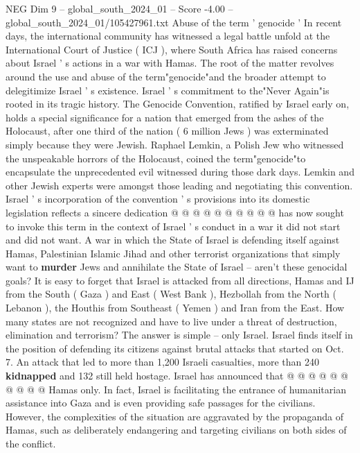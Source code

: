 \begin{textsample}{NEG Dim 9 – global\_south\_2024\_01 – Score -4.00 – global\_south\_2024\_01/105427961.txt}  \label{ex:f9_neg_427}
Abuse of the term ' genocide ' In recent days, the international community has witnessed a legal battle unfold at the International Court of Justice ( ICJ ), where South Africa has raised concerns about Israel ' s actions in a war with Hamas.
The root of the matter revolves around the use and abuse of the term"genocide"and the broader attempt to delegitimize Israel ' s existence.
Israel ' s commitment to the"Never Again"is rooted in its tragic history.
The Genocide Convention, ratified by Israel early on, holds a special significance for a nation that emerged from the ashes of the Holocaust, after one third of the nation ( 6 million Jews ) was exterminated simply because they were Jewish.
Raphael Lemkin, a Polish Jew who witnessed the unspeakable horrors of the Holocaust, coined the term"genocide"to encapsulate the unprecedented evil witnessed during those dark days.
Lemkin and other Jewish experts were amongst those leading and negotiating this convention.
Israel ' s incorporation of the convention ' s provisions into its domestic legislation reflects a sincere dedication @ @ @ @ @ @ @ @ @ @ has now sought to invoke this term in the context of Israel ' s conduct in a war it did not start and did not want.
A war in which the State of Israel is defending itself against Hamas, Palestinian Islamic Jihad and other terrorist organizations that simply want to \textbf{murder} Jews and annihilate the State of Israel -- aren't these genocidal goals?
It is easy to forget that Israel is attacked from all directions, Hamas and IJ from the South ( Gaza ) and East ( West Bank ), Hezbollah from the North ( Lebanon ), the Houthis from Southeast ( Yemen ) and Iran from the East.
How many states are not recognized and have to live under a threat of destruction, elimination and terrorism?
The answer is simple -- only Israel.
Israel finds itself in the position of defending its citizens against brutal attacks that started on Oct. 7.
An attack that led to more than 1,200 Israeli casualties, more than 240 \textbf{kidnapped} and 132 still held hostage.
Israel has announced that @ @ @ @ @ @ @ @ @ @ Hamas only.
In fact, Israel is facilitating the entrance of humanitarian assistance into Gaza and is even providing safe passages for the civilians.
However, the complexities of the situation are aggravated by the propaganda of Hamas, such as deliberately endangering and targeting civilians on both sides of the conflict.

\end{textsample}
